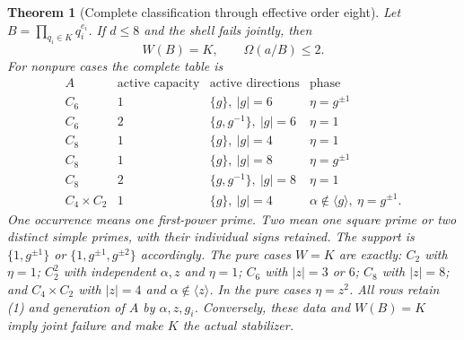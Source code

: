 \documentclass[10pt,a4paper]{article}
\newtheorem{theorem}{Theorem}
\begin{document}
\newpage
\begin{theorem}[Complete classification through effective order eight]
Let $B=\prod_{q_i\in K}q_i^{e_i}$. If $d\le8$ and the shell fails jointly,
then
\[
 \boxed{W(B)=K,\qquad\Omega(a/B)\le2.}                   \tag{4}
\]
For nonpure cases the complete table is
\[
\begin{array}{c|c|c|c}
 A&\text{active capacity}&\text{active directions}&\text{phase}\\\hline
 C_6&1&\{g\},\ |g|=6&\eta=g^{\pm1}\\
 C_6&2&\{g,g^{-1}\},\ |g|=6&\eta=1\\
 C_8&1&\{g\},\ |g|=4&\eta=1\\
 C_8&1&\{g\},\ |g|=8&\eta=g^{\pm1}\\
 C_8&2&\{g,g^{-1}\},\ |g|=8&\eta=1\\
 C_4\times C_2&1&\{g\},\ |g|=4&\alpha\notin\langle g\rangle,\ \eta=g^{\pm1}.
\end{array}                                                  \tag{5}
\]
One occurrence means one first-power prime. Two mean one square prime or two
distinct simple primes, with their individual signs retained. The support is
$\{1,g^{\pm1}\}$ or $\{1,g^{\pm1},g^{\pm2}\}$ accordingly.
The pure cases $W=K$ are exactly: $C_2$ with $\eta=1$;
$C_2^2$ with independent $\alpha,z$ and $\eta=1$;
$C_6$ with $|z|=3$ or $6$;
$C_8$ with $|z|=8$;
and $C_4\times C_2$ with $|z|=4$ and $\alpha\notin\langle z\rangle$.
In the pure cases $\eta=z^2$. All rows retain (1) and generation of $A$ by
$\alpha,z,g_i$. Conversely, these data and $W(B)=K$ imply joint failure and
make $K$ the actual stabilizer.
\end{theorem}
\end{document}
